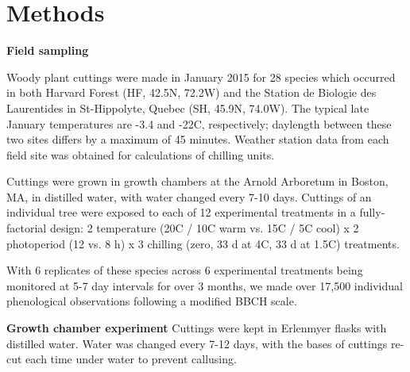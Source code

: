 \documentclass{article}
\begin{document}

\section*{Methods}

\textbf{Field sampling}

Woody plant cuttings were made in January 2015 for 28 species which occurred in both Harvard Forest (HF, 42.5\degree N, 72.2\degree W) and the Station de Biologie des Laurentides in St-Hippolyte, Quebec (SH, 45.9\degree N, 74.0\degree W). The typical late January temperatures are -3.4 and -22\degree C, respectively; daylength between these two sites differs by a maximum of 45 minutes. Weather station data from each field site was obtained for calculations of chilling units. 

Cuttings were grown in growth chambers at the Arnold Arboretum in Boston, MA, in distilled water, with water changed every 7-10 days. Cuttings of an individual tree were exposed to each of 12 experimental treatments in a fully-factorial design: 2 temperature (20\degree C / 10\degree C warm vs. 15\degree C / 5\degree C cool) x 2 photoperiod (12 vs. 8 h) x 3 chilling (zero,  33 d at 4\degree C, 33 d at 1.5\degree C) treatments. 

With 6 replicates of these species across 6 experimental treatments being monitored at 5-7 day intervals for over 3 months, we made over 17,500 individual phenological observations following a modified BBCH scale.

\textbf{Growth chamber experiment}
Cuttings were kept in Erlenmyer flasks with distilled water. Water was changed every 7-12 days, with the bases of cuttings re-cut each time under water to prevent callusing.
\end{document}
